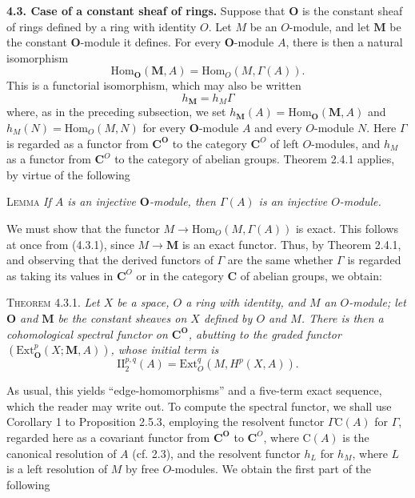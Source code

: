 \clearpage
{}

\textbf{4.3. Case of a constant sheaf of rings.}
Suppose that $\mathbf O$ is the constant sheaf of rings defined by a ring
with identity $O$. Let $M$ be an $O$-module, and let $\mathbf M$ be the
constant $\mathbf O$-module it defines. For every $\mathbf O$-module $A$,
there is then a natural isomorphism
\[
\tag{4.3.1}
\mathrm{Hom}_{\mathbf O}(\mathbf M,A)=\mathrm{Hom}_O(M,\Gamma(A)).
\]
This is a functorial isomorphism, which may also be written
\[
\tag{4.3.2}
h_{\mathbf M}=h_M\Gamma
\]
where, as in the preceding subsection, we set
$h_{\mathbf M}(A)=\mathrm{Hom}_{\mathbf O}(\mathbf M,A)$ and
$h_M(N)=\mathrm{Hom}_O(M,N)$ for every $\mathbf O$-module $A$ and every
$O$-module $N$. Here $\Gamma$ is regarded as a functor from
$\mathbf C^{\mathbf O}$ to the category $\mathbf C^O$ of left $O$-modules, and
$h_M$ as a functor from $\mathbf C^O$ to the category of abelian
groups. Theorem 2.4.1 applies, by virtue of the following

\textsc{Lemma} \textit{If $A$ is an injective $\mathbf O$-module,
then $\Gamma(A)$ is an injective $O$-module.}

We must show that the functor
$M\to\mathrm{Hom}_O(M,\Gamma(A))$ is exact. This follows at once from
(4.3.1), since $M\to\mathbf M$ is an exact functor. Thus, by Theorem
2.4.1, and observing that the derived functors of $\Gamma$ are the same
whether $\Gamma$ is regarded as taking its values in $\mathbf C^O$ or in the category
$\mathbf C$ of abelian groups, we obtain:

\textsc{Theorem 4.3.1.} \textit{Let $X$ be a space, $O$ a ring with
identity, and $M$ an $O$-module; let $\mathbf O$ and $\mathbf M$ be the
constant sheaves on $X$ defined by $O$ and $M$. There is then a cohomological
spectral functor on $\mathbf C^{\mathbf O}$, abutting to the graded functor
$(\mathrm{Ext}_{\mathbf O}^p(X;\mathbf M,A))$, whose initial term is}
\[
\tag{4.3.3}
\mathrm{II}_2^{p,q}(A)=\mathrm{Ext}_O^q(M,H^p(X,A)).
\]

As usual, this yields ``edge-homomorphisms'' and a five-term exact sequence, which
the reader may write out.
To compute the spectral functor, we shall use Corollary 1 to Proposition
2.5.3, employing the resolvent functor $\Gamma \mathrm C(A)$ for $\Gamma$, regarded
here as a covariant functor from $\mathbf C^{\mathbf O}$ to $\mathbf C^O$, where $\mathrm C(A)$ is the
canonical resolution of $A$ (cf. 2.3), and the resolvent functor $h_L$ for
$h_M$, where $L$ is a left resolution of $M$ by free $O$-modules. We obtain
the first part of the following

